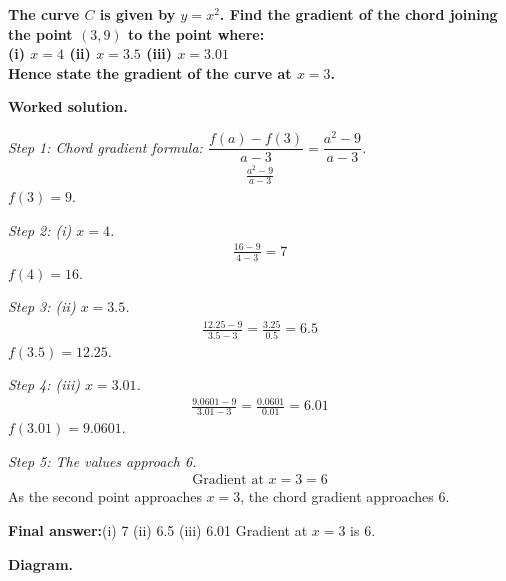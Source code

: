 \documentclass[11pt]{article}
\newcommand{\question}[1]{\par\medskip\noindent\textbf{#1}\par}
\begin{document}
\question{The curve \( C \) is given by \( y = x^2 \). Find the gradient of the chord joining the point \( (3, 9) \) to the point where:\\[3pt]  (i) \( x = 4 \) \quad  (ii) \( x = 3.5 \) \quad  (iii) \( x = 3.01 \)\\[3pt]  Hence state the gradient of the curve at \( x = 3 \).}

\textbf{Worked solution.}

\textit{Step 1: Chord gradient formula: \( \dfrac{f(a) - f(3)}{a - 3} = \dfrac{a^2 - 9}{a - 3} \).}
\[\begin{gathered}
\frac{a^2 - 9}{a - 3}
\end{gathered}\]
\( f(3) = 9 \).

\textit{Step 2: (i) \( x = 4 \).}
\[\begin{gathered}
\frac{16 - 9}{4 - 3} = 7
\end{gathered}\]
\( f(4) = 16 \).

\textit{Step 3: (ii) \( x = 3.5 \).}
\[\begin{gathered}
\frac{12.25 - 9}{3.5 - 3} = \frac{3.25}{0.5} = 6.5
\end{gathered}\]
\( f(3.5) = 12.25 \).

\textit{Step 4: (iii) \( x = 3.01 \).}
\[\begin{gathered}
\frac{9.0601 - 9}{3.01 - 3} = \frac{0.0601}{0.01} = 6.01
\end{gathered}\]
\( f(3.01) = 9.0601 \).

\textit{Step 5: The values approach 6.}
\[\begin{gathered}
\text{Gradient at } x = 3 = 6
\end{gathered}\]
As the second point approaches \( x = 3 \), the chord gradient approaches 6.

\begin{answerbox}
\textbf{Final answer:}\quad (i) 7 \quad  (ii) 6.5 \quad  (iii) 6.01 \quad  Gradient at \(\displaystyle  x = 3 \) is 6.
\end{answerbox}
\textbf{Diagram.}
\end{document}
